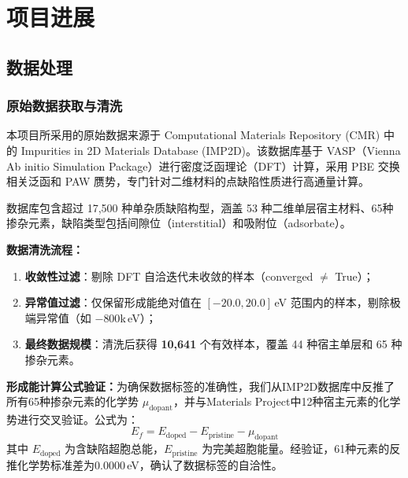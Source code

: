 
\chapter{项目进展}


\section{数据处理}

\subsection{原始数据获取与清洗}

本项目所采用的原始数据来源于 Computational Materials Repository (CMR) 中的 Impurities in 2D Materials Database (IMP2D)。该数据库基于 VASP（Vienna Ab initio Simulation Package）进行密度泛函理论（DFT）计算，采用 PBE 交换相关泛函和 PAW 赝势，专门针对二维材料的点缺陷性质进行高通量计算。

数据库包含超过 17,500 种单杂质缺陷构型，涵盖 53 种二维单层宿主材料、65种掺杂元素，缺陷类型包括间隙位（interstitial）和吸附位（adsorbate）。

\textbf{数据清洗流程：}
\begin{enumerate}
    \item \textbf{收敛性过滤}：剔除 DFT 自洽迭代未收敛的样本（converged $\neq$ True）；
    \item \textbf{异常值过滤}：仅保留形成能绝对值在 $[-20.0, 20.0]$\,eV 范围内的样本，剔除极端异常值（如 $-800$k\,eV）；
    \item \textbf{最终数据规模}：清洗后获得 \textbf{10,641} 个有效样本，覆盖 44 种宿主单层和 65 种掺杂元素。
\end{enumerate}

\textbf{形成能计算公式验证：}为确保数据标签的准确性，我们从IMP2D数据库中反推了所有65种掺杂元素的化学势 $\mu_{\mathrm{dopant}}$，并与Materials Project中12种宿主元素的化学势进行交叉验证。公式为：
\[
E_f = E_{\mathrm{doped}} - E_{\mathrm{pristine}} - \mu_{\mathrm{dopant}}
\]
其中 $E_{\mathrm{doped}}$ 为含缺陷超胞总能，$E_{\mathrm{pristine}}$ 为完美超胞能量。经验证，61种元素的反推化学势标准差为0.0000\,eV，确认了数据标签的自洽性。

